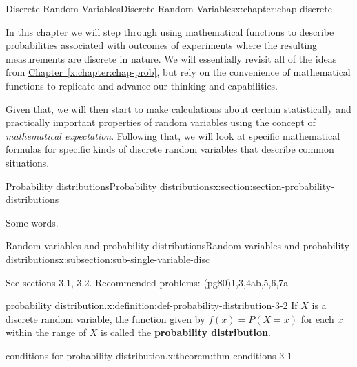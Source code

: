 \documentclass[oneside,10pt,]{book}
\newcommand{\xreffont}{\relax}
\newcommand{\terminology}[1]{\textbf{#1}}
\numberwithin{equation}{section}
\begin{document}
\begin{chapterptx}{Discrete Random Variables}{}{Discrete Random Variables}{}{}{x:chapter:chap-discrete}
\begin{introduction}{}%
In this chapter we will step through using mathematical functions to describe probabilities associated with outcomes of experiments where the resulting measurements are discrete in nature.  We will essentially revisit all of the ideas from \hyperref[x:chapter:chap-prob]{Chapter~{\xreffont\ref{x:chapter:chap-prob}}}, but rely on the convenience of mathematical functions to replicate and advance our thinking and capabilities.%
\par
Given that, we will then start to make calculations about certain statistically and practically important properties of random variables using the concept of \emph{mathematical expectation}.  Following that, we will look at specific mathematical formulas for specific kinds of discrete random variables that describe common situations.%
\end{introduction}%
%
%
\typeout{************************************************}
\typeout{************************************************}
%
\begin{sectionptx}{Probability distributions}{}{Probability distributions}{}{}{x:section:section-probability-distributions}
\begin{introduction}{}%
Some words.%
\end{introduction}%
%
%
\typeout{************************************************}
\typeout{************************************************}
%
\begin{subsectionptx}{Random variables and probability distributions}{}{Random variables and probability distributions}{}{}{x:subsection:sub-single-variable-disc}
\begin{introduction}{}%
See sections 3.1, 3.2. Recommended problems: (pg80)1,3,4ab,5,6,7a%
\end{introduction}%
\begin{definition}{probability distribution.}{x:definition:def-probability-distribution-3-2}%
If \(\displaystyle X\) is a discrete random variable, the function given by \(\displaystyle f(x) = P(X = x)\) for each \(\displaystyle
x\) within the range of \(\displaystyle X\) is called the \terminology{probability distribution}.%
\end{definition}
\begin{theorem}{conditions for probability distribution.}{}{x:theorem:thm-conditions-3-1}%

\end{theorem}
\end{subsectionptx}
\end{sectionptx}
\end{chapterptx}
\end{document}
